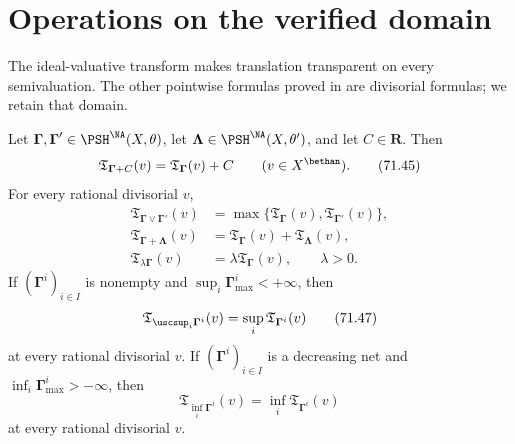 \section{Operations on the verified domain}

The ideal-valuative transform makes translation transparent on every
semivaluation.  The other pointwise formulas proved in
\cite{Xia23Operations} are divisorial formulas; we retain that domain.

\begin{proposition}\label{prop:pseff-operation-formulas}
Let \(\boldsymbol\Gamma,\boldsymbol\Gamma'\in
\PSH^{\NA}(X,\theta)\), let
\(\boldsymbol\Lambda\in\PSH^{\NA}(X,\theta')\), and let \(C\in\mathbf R\).
Then
\[
 \mathfrak T_{\boldsymbol\Gamma+C}(v)
 =\mathfrak T_{\boldsymbol\Gamma}(v)+C
 \qquad(v\in X^{\bethan}).
\tag{71.45}\label{eq:pseff-operation-translation}
\]
For every rational divisorial \(v\),
\[
 \begin{aligned}
 \mathfrak T_{\boldsymbol\Gamma\vee\boldsymbol\Gamma'}(v)
   &=\max\{\mathfrak T_{\boldsymbol\Gamma}(v),
            \mathfrak T_{\boldsymbol\Gamma'}(v)\},\\
 \mathfrak T_{\boldsymbol\Gamma+\boldsymbol\Lambda}(v)
   &=\mathfrak T_{\boldsymbol\Gamma}(v)
     +\mathfrak T_{\boldsymbol\Lambda}(v),\\
 \mathfrak T_{\lambda\boldsymbol\Gamma}(v)
   &=\lambda\mathfrak T_{\boldsymbol\Gamma}(v),
 \qquad \lambda>0.
 \end{aligned}
\tag{71.46}\label{eq:pseff-operation-algebra}
\]
If \((\boldsymbol\Gamma^i)_{i\in I}\) is nonempty and
\(\sup_i\boldsymbol\Gamma^i_{\max}<+\infty\), then
\[
 \mathfrak T_{\uscsup_i\boldsymbol\Gamma^i}(v)
 =\sup_i\mathfrak T_{\boldsymbol\Gamma^i}(v)
\tag{71.47}\label{eq:pseff-operation-supremum}
\]
at every rational divisorial \(v\).  If
\((\boldsymbol\Gamma^i)_{i\in I}\) is a decreasing net and
\(\inf_i\boldsymbol\Gamma^i_{\max}>-\infty\), then
\[
 \mathfrak T_{\inf_i\boldsymbol\Gamma^i}(v)
 =\inf_i\mathfrak T_{\boldsymbol\Gamma^i}(v)
\tag{71.48}\label{eq:pseff-operation-infimum}
\]
at every rational divisorial \(v\).
\end{proposition}

